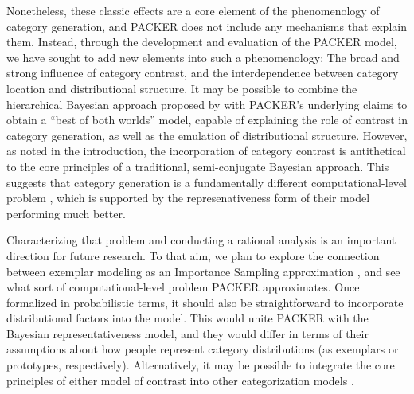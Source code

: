 \documentclass[12pt]{article}
\begin{document}
\begin{flushleft}
Nonetheless, these classic effects are a core element of the phenomenology of
category generation, and PACKER does not include any mechanisms that explain
them. Instead, through the development and evaluation of the PACKER model, we
have sought to add new elements into such a phenomenology: The broad and strong
influence of category contrast, and the interdependence between category
location and distributional structure. It may be possible to combine the
hierarchical Bayesian approach proposed by \cite{jern2013probabilistic} with
PACKER's underlying claims to obtain a ``best of both worlds'' model, capable of
explaining the role of contrast in category generation, as well as the emulation
of distributional structure. However, as noted in the introduction, the
incorporation of category contrast is antithetical to the core principles of a
traditional, semi-conjugate Bayesian approach. This suggests that category
generation is a fundamentally different computational-level problem
\citep[different from those posed by][]{jern2013probabilistic,kemp2014taxonomy}, which is supported by the represenativeness form of their model performing much better.

Characterizing that problem and conducting a rational analysis is an important
direction for future research. To that aim, we plan to explore the connection
between exemplar modeling as an Importance Sampling approximation
\citep{shi10exemplar}, and see what sort of computational-level problem PACKER
approximates. Once formalized in probabilistic terms, it should also be
straightforward to incorporate distributional factors into the model. This would
unite PACKER with the Bayesian representativeness model, and they would differ
in terms of their assumptions about how people represent category distributions
(as exemplars or prototypes, respectively). Alternatively, it may be possible to
integrate the core principles of either model of contrast into other
categorization models
\citep[e.g.,][]{love2004sustain,kurtz2007divergent,smith2000thirty}.


\end{flushleft}
\end{document}

